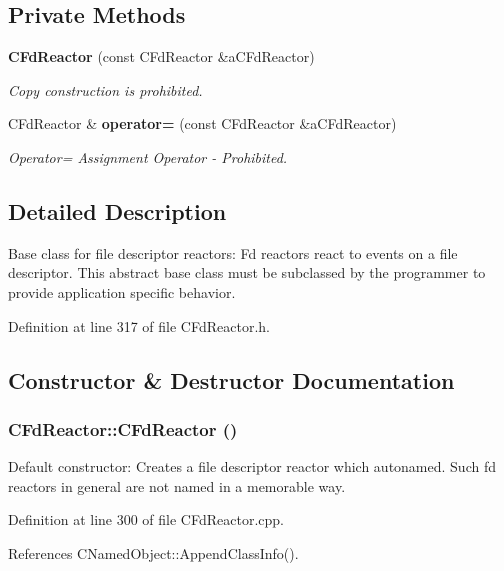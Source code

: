 \subsection*{Private Methods}
\begin{CompactItemize}
\item 
{\bf CFd\-Reactor} (const CFd\-Reactor \&a\-CFd\-Reactor)
\begin{CompactList}\small\item\em Copy construction is prohibited.\item\end{CompactList}\item 
CFd\-Reactor \& {\bf operator=} (const CFd\-Reactor \&a\-CFd\-Reactor)
\begin{CompactList}\small\item\em Operator= Assignment Operator - Prohibited.\item\end{CompactList}\end{CompactItemize}


\subsection{Detailed Description}
Base class for file descriptor reactors: Fd reactors react to events on a file descriptor. This abstract base class must be subclassed by the programmer to provide application specific behavior. 



Definition at line 317 of file CFd\-Reactor.h.

\subsection{Constructor \& Destructor Documentation}
\subsubsection{\setlength{\rightskip}{0pt plus 5cm}CFd\-Reactor::CFd\-Reactor ()}\label{classCFdReactor_a0}


Default constructor: Creates a file descriptor reactor which autonamed. Such fd reactors in general are not named in a memorable way. 

Definition at line 300 of file CFd\-Reactor.cpp.

References CNamed\-Object::Append\-Class\-Info().
